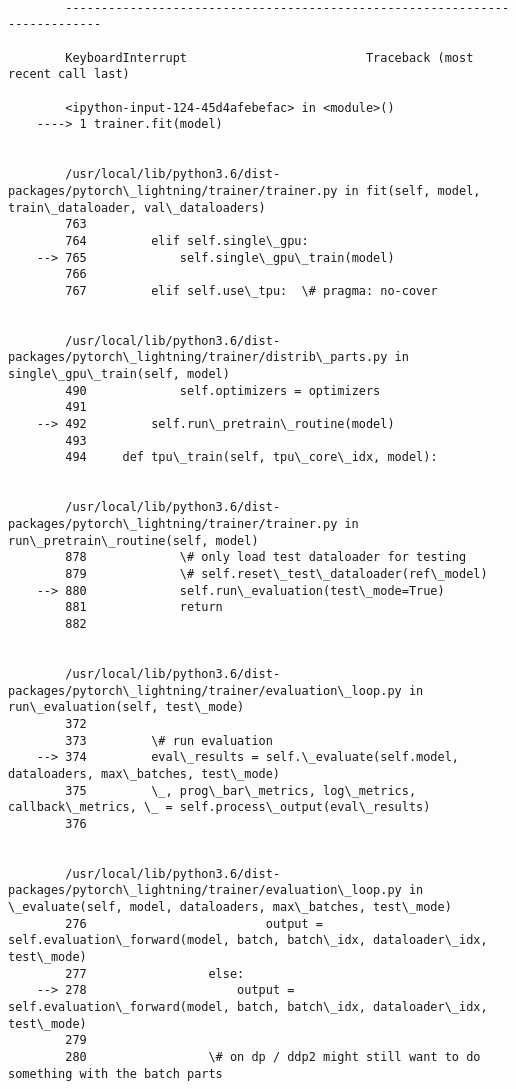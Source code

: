 \documentclass[10pt]{article}
\begin{document}
    \begin{Verbatim}[commandchars=\\\{\}]

        ---------------------------------------------------------------------------

        KeyboardInterrupt                         Traceback (most recent call last)

        <ipython-input-124-45d4afebefac> in <module>()
    ----> 1 trainer.fit(model)
    

        /usr/local/lib/python3.6/dist-packages/pytorch\_lightning/trainer/trainer.py in fit(self, model, train\_dataloader, val\_dataloaders)
        763 
        764         elif self.single\_gpu:
    --> 765             self.single\_gpu\_train(model)
        766 
        767         elif self.use\_tpu:  \# pragma: no-cover


        /usr/local/lib/python3.6/dist-packages/pytorch\_lightning/trainer/distrib\_parts.py in single\_gpu\_train(self, model)
        490             self.optimizers = optimizers
        491 
    --> 492         self.run\_pretrain\_routine(model)
        493 
        494     def tpu\_train(self, tpu\_core\_idx, model):


        /usr/local/lib/python3.6/dist-packages/pytorch\_lightning/trainer/trainer.py in run\_pretrain\_routine(self, model)
        878             \# only load test dataloader for testing
        879             \# self.reset\_test\_dataloader(ref\_model)
    --> 880             self.run\_evaluation(test\_mode=True)
        881             return
        882 


        /usr/local/lib/python3.6/dist-packages/pytorch\_lightning/trainer/evaluation\_loop.py in run\_evaluation(self, test\_mode)
        372 
        373         \# run evaluation
    --> 374         eval\_results = self.\_evaluate(self.model, dataloaders, max\_batches, test\_mode)
        375         \_, prog\_bar\_metrics, log\_metrics, callback\_metrics, \_ = self.process\_output(eval\_results)
        376 


        /usr/local/lib/python3.6/dist-packages/pytorch\_lightning/trainer/evaluation\_loop.py in \_evaluate(self, model, dataloaders, max\_batches, test\_mode)
        276                         output = self.evaluation\_forward(model, batch, batch\_idx, dataloader\_idx, test\_mode)
        277                 else:
    --> 278                     output = self.evaluation\_forward(model, batch, batch\_idx, dataloader\_idx, test\_mode)
        279 
        280                 \# on dp / ddp2 might still want to do something with the batch parts



\end{Verbatim}
\end{document}

